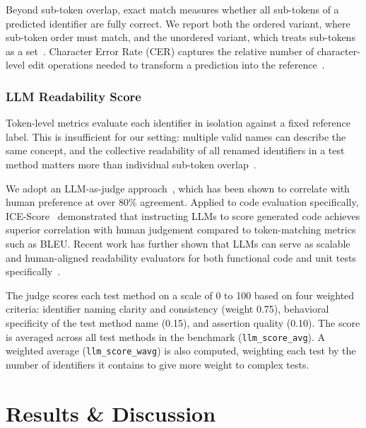 \documentclass[conference]{IEEEtran}
\begin{document}
Beyond sub-token overlap, exact match measures whether all sub-tokens of a
predicted identifier are fully correct.
We report both the ordered variant, where sub-token order must match, and the
unordered variant, which treats sub-tokens as a set~\cite{liu2023refbert}.
Character Error Rate (CER) captures the relative number of character-level edit
operations needed to transform a prediction into the
reference~\cite{allamanis2018learning}.

\subsubsection{LLM Readability Score}

Token-level metrics evaluate each identifier in isolation against a fixed
reference label.
This is insufficient for our setting: multiple valid names can describe the
same concept, and the collective readability of all renamed identifiers in a
test method matters more than individual sub-token
overlap~\cite{scalabrino2018readability}.

We adopt an LLM-as-judge approach~\cite{zheng2023judging}, which has been shown
to correlate with human preference at over 80\% agreement.
Applied to code evaluation specifically,
ICE-Score~\cite{zhuo2024ice} demonstrated that instructing LLMs to score
generated code achieves superior correlation with human judgement compared to
token-matching metrics such as BLEU.
Recent work has further shown that LLMs can serve as scalable and
human-aligned readability evaluators for both functional code and unit tests
specifically~\cite{ouedraogo2025coreval}.

The judge scores each test method on a scale of 0 to 100 based on four
weighted criteria: identifier naming clarity and consistency (weight 0.75),
behavioral specificity of the test method name (0.15), and assertion quality
(0.10).
The score is averaged across all test methods in the benchmark
(\texttt{llm\_score\_avg}).
A weighted average (\texttt{llm\_score\_wavg}) is also computed, weighting each
test by the number of identifiers it contains to give more weight to complex
tests.

\section{Results \& Discussion}
\label{sec:results}
\end{document}
